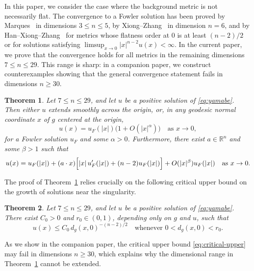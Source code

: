 \documentclass[11pt]{article}
\numberwithin{equation}{section}
\newtheorem{theorem}{Theorem}[section]
\theoremstyle{remark}
\begin{document}
In this paper, we consider the case where the background metric is not
necessarily flat. The convergence to a Fowler solution has been proved by
Marques~\cite{f-mar} in dimensions $3\le n\le 5$, by Xiong--Zhang~\cite{x-z-1}
in dimension $n=6$, and by Han--Xiong--Zhang~\cite{HanXiongZhang} for metrics
whose flatness order at $0$ is at least $(n-2)/2$ or for solutions satisfying $\limsup_{x\to 0} |x|^{n-2}u(x)<\infty$. In the current paper, we prove that the convergence holds for all metrics in the remaining dimensions
$7\le n\le 29$. This range is sharp: in a companion
paper, we construct counterexamples showing that the general convergence statement fails in dimensions $n\ge30$.

\begin{theorem}\label{thm:main}
	Let $7\le n\le29$, and let $u$ be a positive solution of \eqref{eq:yamabe}.
	Then either $u$ extends smoothly across the origin, or, in any geodesic normal coordinate $x$ of $g$
	centered at the origin,
	\begin{equation}\label{eq:main-fowler-asymptotic}
		 u(x)=u_F(|x|)\bigl(1+O(|x|^\alpha)\bigr)
		\quad\text{as } x\to0,
	\end{equation}
	for a Fowler solution $u_F$ and some $\alpha>0$.
    Furthermore, there exist $a\in \mathbb{R}^n$ and
some $\beta>1$ such that
\begin{equation}\label{eq:main-fowler-asymptotic-order1}
 u(x)=u_F(|x|)
+
(a\cdot x)\Bigl[|x|\,u_F'(|x|)+(n-2)u_F(|x|)\Bigr]
+
O(|x|^\beta)u_F(|x|)
 \quad\text{as }x\to0.
\end{equation}
\end{theorem} 

  The proof of Theorem~\ref{thm:main} relies crucially on the following
critical upper bound on the growth of solutions near the singularity.

\begin{theorem}\label{thm:upper-bound}
	Let $7\le n\le29$, and let $u$ be a positive solution of \eqref{eq:yamabe}.
	There exist $C_0>0$ and $r_0\in(0,1)$, depending only on $g$ and $u$, such
	that
	\begin{equation}\label{eq:critical-upper}
		u(x)\le C_0\,d_g(x,0)^{-(n-2)/2}
		\quad\text{whenever }0<d_g(x,0)<r_0.
	\end{equation}
\end{theorem}

As we show in the companion paper, the critical upper bound
\eqref{eq:critical-upper} may fail in dimensions $n\ge30$, which explains why the dimensional range in Theorem~\ref{thm:main} cannot be extended. 
\end{document}
